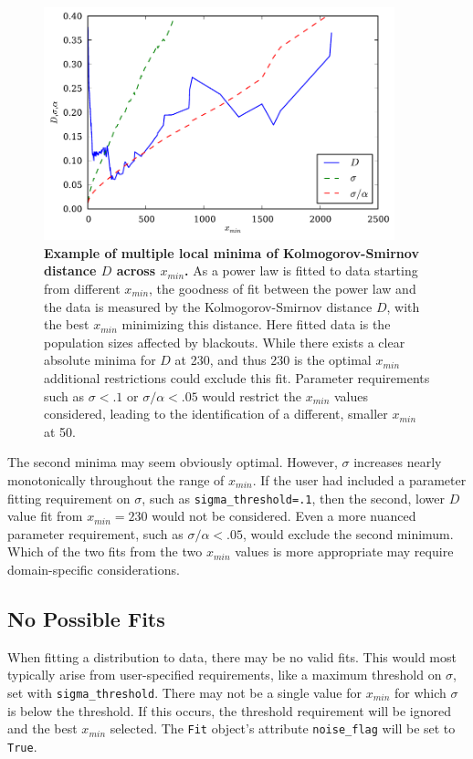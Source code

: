 \documentclass[10pt]{article}
\begin{document}
\begin{figure}[!ht]
\begin{center}
\includegraphics[width=4in]{FigD.pdf}
\end{center}
\caption{
{\bf Example of multiple local minima of Kolmogorov-Smirnov distance $D$ across $x_{min}$.} As a power law is fitted to data starting from different $x_{min}$, the goodness of fit between the power law and the data is measured by the Kolmogorov-Smirnov distance $D$, with the best $x_{min}$ minimizing this distance. Here fitted data is the population sizes affected by blackouts. While there exists a clear absolute minima for $D$ at 230, and thus 230 is the optimal $x_{min}$ additional restrictions could exclude this fit. Parameter requirements such as $\sigma<.1$ or $\sigma /\alpha<.05$ would restrict the $x_{min}$ values considered, leading to the identification of a different, smaller $x_{min}$ at 50.
}
\label{Ds}
\end{figure}

 The second minima may seem obviously optimal. However, $\sigma$ increases nearly monotonically throughout the range of $x_{min}$. If the user had included a parameter fitting requirement on $\sigma$, such as \verb$sigma_threshold=.1$, then the second, lower $D$ value fit from $x_{min}=230$ would not be considered. Even a more nuanced parameter requirement, such as $\sigma / \alpha < .05$, would exclude the second minimum. Which of the two fits from the two $x_{min}$ values is more appropriate may require domain-specific considerations. 
 
 \subsection*{No Possible Fits}
 When fitting a distribution to data, there may be no valid fits. This would most typically arise from user-specified requirements, like a maximum threshold on $\sigma$, set with \verb$sigma_threshold$. There may not be a single value for $x_{min}$ for which $\sigma$ is below the threshold. If this occurs, the threshold requirement will be ignored and the best $x_{min}$ selected. The \verb$Fit$ object's attribute \verb$noise_flag$ will be set to \verb$True$. 
 
\end{document}
